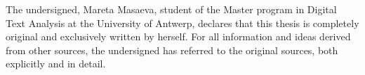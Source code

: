 \thispagestyle{plain}
\begin{center}


The undersigned, Mareta Masaeva, student of the Master program in Digital Text Analysis at the University of Antwerp, declares that this thesis is completely original and exclusively written by herself. For all information and ideas derived from other sources, the undersigned has referred to the original sources, both explicitly and in detail.
 
\end{center}
